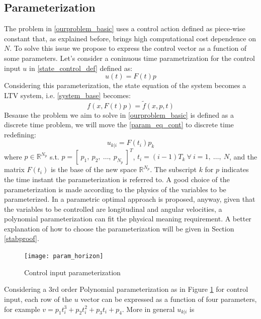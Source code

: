 \subsection{Parameterization}
The problem in \ref{ourproblem_basic} uses a control action defined as piece-wise constant that, as explained before, brings high computational cost dependence on $N$. To solve this issue we propose to express the control vector as a function of some parameters.
Let's consider a coninuous time parametrization for the control input $u$ in \ref{state_control_def} defined as:
\begin{equation}
{u}(t)=F(t)p
\label{param_eq_cont}
\end{equation}
Considering this parameterization, the state equation of the system becomes a LTV system, i.e. \ref{system_base} becomes:
\begin{equation}
	f(x,F(t)p)=\tilde{f}(x,p,t)
	\label{state_eq_par}
\end{equation}
Besause the problem we aim to solve in \ref{ourproblem_basic} is defined as a discrete time problem, we will move the \ref{param_eq_cont} to discrete time redefining:
\begin{equation}\label{param_eq}
{u}_{k|i}=F(t_i)p_k
\end{equation}
where $p \in \mathbb{R}^{N_p}$ s.t. $p=[\ p_1,\ p_2,\ \dots,\ p_{N_p}\ ]^T$, $t_i=(i-1)T_k\ \forall\ i=1,\ \dots,\  N$, and the matrix $F(t_i)$ is the base of the new space $\mathbb{R}^{N_p}$. The subscript $k$ for $p$ indicates the time instant the parameterization is referred to. A good choice of the parameterization is made according to the physics of the variables to be parameterized. In \cite{kelly2013mobile} a parametric optimal approach is proposed, anyway, given that the variables to be controlled are longitudinal and angular velocities, a polynomial parameterization can fit the physical meaning requirement. A better explanation of how to choose the parameterization will be given in Section \ref{stabproof}.
\begin{figure}[h!]
	\centering
	\texttt{[image: param\_horizon]}
	\caption{Control input parameterization}
	\label{param_horizon}
\end{figure}
Considering a 3rd order Polynomial parameterization as in Figure \ref{param_horizon} for control input, each row of the ${u}$ vector can be expressed as a function of four parameters, for example $v=p_1t_i^3+p_2t_i^2+p_3t_i+p_4$. More in general ${u}_{k|i}$ is
